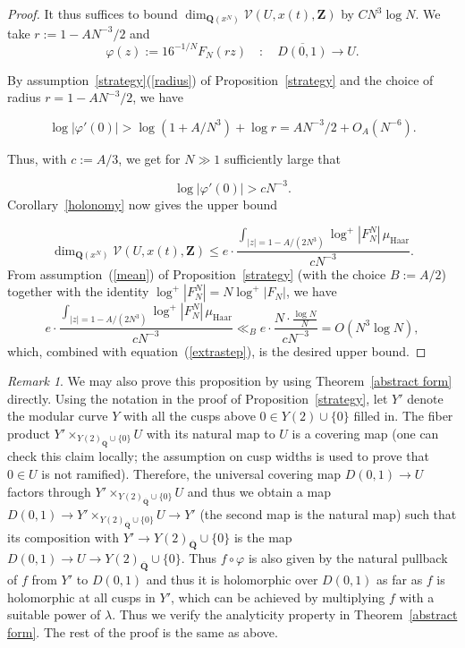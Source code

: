 \documentclass[10pt]{amsart}
\def\Z{\mathbf{Z}}
\def\Q{\mathbf{Q}}
\theoremstyle{remark}
\newtheorem{remark}[subsubsection]{Remark}
\numberwithin{equation}{subsection}
\def\numequation{\addtocounter{subsubsection}{1}\begin{equation}}
\begin{document}
\begin{proof}
 It thus suffices to bound $\dim_{\Q(x^N)}\mathcal{V}(U,x(t),\Z)$ by $CN^3\log{N}$.
We take $r := 1 - AN^{-3}/2$ and
$$
\varphi(z) := 16^{-1/N}F_N(rz) \quad  : \quad \overline{D(0,1)} \to U.
$$

By assumption~\ref{strategy}(\ref{radius}) of  Proposition~\ref{strategy} and the choice of radius $r = 1  - AN^{-3}/2$, we have
\numequation \label{deg}
 \log{|\varphi'(0)|}
> \log{(1+A/N^3)}  + \log{r}  
= A N^{-3} / 2 + O_{A}(N^{-6}).
\end{equation}


Thus, with $c := A/3$, we get for $N \gg 1$ sufficiently large that
\numequation \label{redeg}
\log{|\varphi'(0)|} > c N^{-3}.
\end{equation}
Corollary~\ref{holonomy} now  gives the upper bound
\numequation
\label{extrastep}
\dim_{\Q(x^N)} \mathcal{V}(U,x(t),\Z) \leq e \cdot \frac{\int_{|z| = 1 - A/(2N^3)} \log^+{|F_N^N|} \, \mu_\mathrm{Haar}}{cN^{-3}}. 
\end{equation}
From assumption~(\ref{mean})
of Proposition~\ref{strategy} (with the choice $B := A/2$) together with the identity $\log^{+}|F_N^N| = N \log^{+} |F_N|$,
we have
$$
 e \cdot \frac{\int_{|z| = 1 - A/(2N^3)} \log^+{|F_N^N|} \, \mu_\mathrm{Haar}}{cN^{-3}}
   \ll_B e \cdot  \frac{\displaystyle{ N \cdot \frac{\log{N}}{N} }}{ c N^{-3}} = O(N^3 \log N),
   $$
   which, combined with equation~(\ref{extrastep}), is the desired upper bound.
\end{proof}

\begin{remark}
We may also prove this proposition by using Theorem~\ref{abstract form} directly. Using the notation in the proof
of Proposition~\ref{strategy}, let $Y'$ denote the modular curve $Y$ with all the cusps above $0\in Y(2)\cup\{0\}$ filled in. The fiber product $Y'\times_{Y(2)_{\overline{\Q}}\cup\{0\}} U$ with its natural map to $U$ is a covering map (one can check this claim locally; the assumption on cusp widths is used to prove that $0\in U$ is not ramified). Therefore, the universal covering map $D(0,1)\rightarrow U$ factors through $Y'\times_{Y(2)_{\overline{\Q}}\cup \{0\}} U$ and thus we obtain a map $D(0,1)\rightarrow Y'\times_{Y(2)_{\overline{\Q}}\cup \{0\}} U\rightarrow Y'$ (the second map is the natural map) such that its composition with $Y'\rightarrow Y(2)_{\overline{\Q}}\cup \{0\}$ is the map $D(0,1)\rightarrow U \rightarrow Y(2)_{\overline{\Q}}\cup \{0\}$. Thus $f\circ \varphi$ is also given by the natural pullback of $f$ from $Y'$ to $D(0,1)$ and thus it is holomorphic over $D(0,1)$ as far as $f$ is holomorphic at all cusps in $Y'$, which can be achieved by multiplying $f$ with a suitable power of $\lambda$. Thus we verify the analyticity property in Theorem~\ref{abstract form}. The rest of the proof is the same as  above.
\end{remark}
\end{document}
